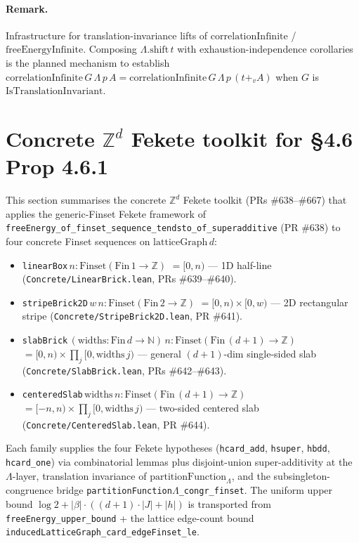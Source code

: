 \documentclass[a4paper,11pt]{article}
\newcommand{\LeanLambda}{\texorpdfstring{\ensuremath{\Lambda}}{Lambda}}
\begin{document}
\paragraph{Remark.}
Infrastructure for translation-invariance lifts of
$\mathrm{correlationInfinite}$ / $\mathrm{freeEnergyInfinite}$.
Composing $\Lambda.\mathrm{shift}\,t$ with exhaustion-independence
corollaries is the planned mechanism to establish
$\mathrm{correlationInfinite}\,G\,\Lambda\,p\,A =
\mathrm{correlationInfinite}\,G\,\Lambda\,p\,(t +_v A)$ when $G$
is $\mathrm{IsTranslationInvariant}$.

\section{Concrete \texorpdfstring{$\mathbb Z^d$}{Z d} Fekete toolkit for \S 4.6 Prop 4.6.1}

This section summarises the concrete $\mathbb Z^d$ Fekete toolkit
(PRs \#638--\#667) that applies the generic-Finset Fekete framework
of \texttt{freeEnergy\_of\_finset\_sequence\_tendsto\_of\_superadditive}
(PR \#638) to four concrete Finset sequences on
$\mathrm{latticeGraph}\,d$:

\begin{itemize}
\item \texttt{linearBox}\,$n : \mathrm{Finset}(\mathrm{Fin}\,1 \to \mathbb Z)$
  $= [0, n)$ — 1D half-line (\texttt{Concrete/LinearBrick.lean}, PRs \#639--\#640).
\item \texttt{stripeBrick2D}\,$w\,n : \mathrm{Finset}(\mathrm{Fin}\,2 \to \mathbb Z)$
  $= [0, n) \times [0, w)$ — 2D rectangular stripe
  (\texttt{Concrete/StripeBrick2D.lean}, PR \#641).
\item \texttt{slabBrick}\,$(\mathrm{widths} : \mathrm{Fin}\,d \to \mathbb N)\,n :
  \mathrm{Finset}(\mathrm{Fin}\,(d+1) \to \mathbb Z)$
  $= [0, n) \times \prod_j [0, \mathrm{widths}\,j)$ — general $(d+1)$-dim
  single-sided slab (\texttt{Concrete/SlabBrick.lean}, PRs \#642--\#643).
\item \texttt{centeredSlab}\,$\mathrm{widths}\,n : \mathrm{Finset}(\mathrm{Fin}\,(d+1) \to \mathbb Z)$
  $= [-n, n) \times \prod_j [0, \mathrm{widths}\,j)$ — two-sided
  centered slab (\texttt{Concrete/CenteredSlab.lean}, PR \#644).
\end{itemize}

Each family supplies the four Fekete hypotheses
(\texttt{hcard\_add}, \texttt{hsuper}, \texttt{hbdd},
\texttt{hcard\_one}) via combinatorial lemmas plus disjoint-union
super-additivity at the $\Lambda$-layer, translation invariance of
$\mathrm{partitionFunction}_\Lambda$, and the subsingleton-congruence
bridge \texttt{partitionFunction\LeanLambda\_congr\_finset}. The uniform upper
bound $\log 2 + |\beta|\cdot((d+1)\cdot|J|+|h|)$ is transported from
\texttt{freeEnergy\_upper\_bound} + the lattice edge-count bound
\texttt{inducedLatticeGraph\_card\_edgeFinset\_le}.
\end{document}
